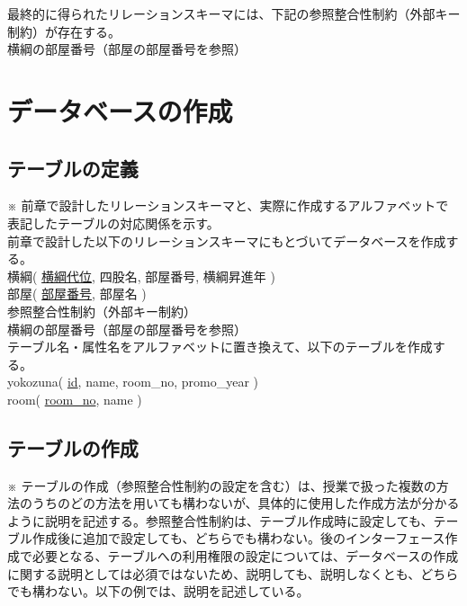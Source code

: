\documentclass[a4j,12pt]{jreport}
\begin{document}
最終的に得られたリレーションスキーマには、下記の参照整合性制約（外部キー制約）が存在する。\\

横綱の部屋番号（部屋の部屋番号を参照）

\chapter{データベースの作成}

\section{テーブルの定義}

※ 前章で設計したリレーションスキーマと、実際に作成するアルファベットで表記したテーブルの対応関係を示す。\\

前章で設計した以下のリレーションスキーマにもとづいてデータベースを作成する。\\

横綱( \underline{横綱代位}, 四股名, 部屋番号, 横綱昇進年 )\\
部屋( \underline{部屋番号}, 部屋名 )\\

参照整合性制約（外部キー制約）\\
横綱の部屋番号（部屋の部屋番号を参照）
\\

テーブル名・属性名をアルファベットに置き換えて、以下のテーブルを作成する。\\

yokozuna( \underline{id}, name, room\_no, promo\_year )\\
room( \underline{room\_no}, name )\\


\section{テーブルの作成}

※ テーブルの作成（参照整合性制約の設定を含む）は、授業で扱った複数の方法のうちのどの方法を用いても構わないが、具体的に使用した作成方法が分かるように説明を記述する。参照整合性制約は、テーブル作成時に設定しても、テーブル作成後に追加で設定しても、どちらでも構わない。後のインターフェース作成で必要となる、テーブルへの利用権限の設定については、データベースの作成に関する説明としては必須ではないため、説明しても、説明しなくとも、どちらでも構わない。以下の例では、説明を記述している。\\
\end{document}
